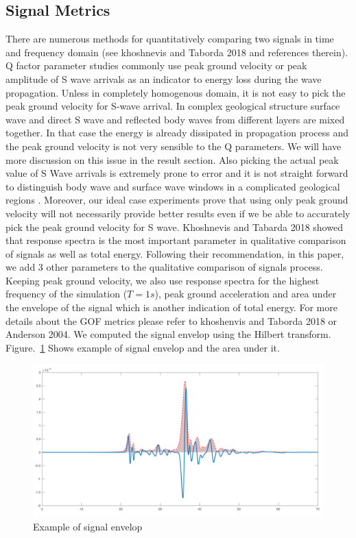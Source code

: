 \subsection{Signal Metrics}

There are numerous methods for quantitatively comparing two signals in time and frequency domain (see khoshnevis and Taborda 2018 and references therein). Q factor parameter studies commonly use peak ground velocity or peak amplitude of S wave arrivals as an indicator to energy loss during the wave propagation. Unless in completely homogenous domain, it is not easy to pick the peak ground velocity for S-wave arrival. In complex geological structure surface wave and  direct S wave and reflected body waves from different layers are mixed together. In that case the energy is already dissipated in propagation process and the peak ground velocity is not very sensible to the Q parameters. We will have more discussion on this issue in the result section. Also picking the actual peak value of S Wave arrivals is extremely prone to error and it is not straight forward to distinguish body wave and surface wave windows in a complicated geological regions \citep[e.g., see][]{bowden2017earthquake}. Moreover, our ideal case experiments prove that using only peak ground velocity will not necessarily provide better results even if we be able to accurately pick the peak ground velocity for S wave. Khoshnevis and Tabarda 2018 showed that response spectra is the most important parameter in qualitative comparison of signals as well as total energy. Following their recommendation, in this paper, we add 3 other parameters to the qualitative comparison of signals process. Keeping peak ground velocity, we also use response spectra for the highest frequency of the simulation ($T= 1s$), peak ground acceleration and area under the envelope of the signal which is another indication of total energy. For more details about the GOF metrics please refer to  khoshenvis and Taborda 2018 or Anderson 2004. We computed the signal envelop using the Hilbert transform. Figure.~\ref{fig:signal_envelop} Shows example of signal envelop and the area under it. 

  \begin{figure}[ht]
    \centering
    \includegraphics[width=\textwidth]{figures/pdf/signal_envelop.pdf}
    \caption{Example of signal envelop}
    \label{fig:signal_envelop}
\end{figure}


